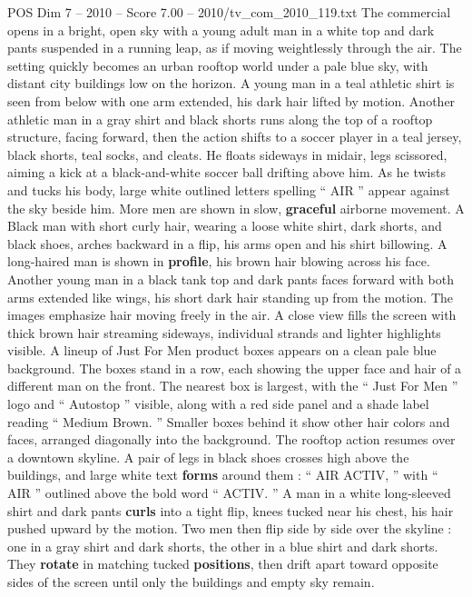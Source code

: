 \begin{textsample}{POS Dim 7 – 2010 – Score 7.00 – 2010/tv\_com\_2010\_119.txt}  \label{ex:f7_pos_055}
The commercial opens in a bright, open sky with a young adult man in a white top and dark pants suspended in a running leap, as if moving weightlessly through the air.
The setting quickly becomes an urban rooftop world under a pale blue sky, with distant city buildings low on the horizon.
A young man in a teal athletic shirt is seen from below with one arm extended, his dark hair lifted by motion.
Another athletic man in a gray shirt and black shorts runs along the top of a rooftop structure, facing forward, then the action shifts to a soccer player in a teal jersey, black shorts, teal socks, and cleats.
He floats sideways in midair, legs scissored, aiming a kick at a black-and-white soccer ball drifting above him.
As he twists and tucks his body, large white outlined letters spelling “ AIR ” appear against the sky beside him.
More men are shown in slow, \textbf{graceful} airborne movement.
A Black man with short curly hair, wearing a loose white shirt, dark shorts, and black shoes, arches backward in a flip, his arms open and his shirt billowing.
A long-haired man is shown in \textbf{profile}, his brown hair blowing across his face.
Another young man in a black tank top and dark pants faces forward with both arms extended like wings, his short dark hair standing up from the motion.
The images emphasize hair moving freely in the air.
A close view fills the screen with thick brown hair streaming sideways, individual strands and lighter highlights visible.
A lineup of Just For Men product boxes appears on a clean pale blue background.
The boxes stand in a row, each showing the upper face and hair of a different man on the front.
The nearest box is largest, with the “ Just For Men ” logo and “ Autostop ” visible, along with a red side panel and a shade label reading “ Medium Brown. ” Smaller boxes behind it show other hair colors and faces, arranged diagonally into the background.
The rooftop action resumes over a downtown skyline.
A pair of legs in black shoes crosses high above the buildings, and large white text \textbf{forms} around them : “ AIR ACTIV, ” with “ AIR ” outlined above the bold word “ ACTIV. ” A man in a white long-sleeved shirt and dark pants \textbf{curls} into a tight flip, knees tucked near his chest, his hair pushed upward by the motion.
Two men then flip side by side over the skyline : one in a gray shirt and dark shorts, the other in a blue shirt and dark shorts.
They \textbf{rotate} in matching tucked \textbf{positions}, then drift apart toward opposite sides of the screen until only the buildings and empty sky remain.

\end{textsample}
